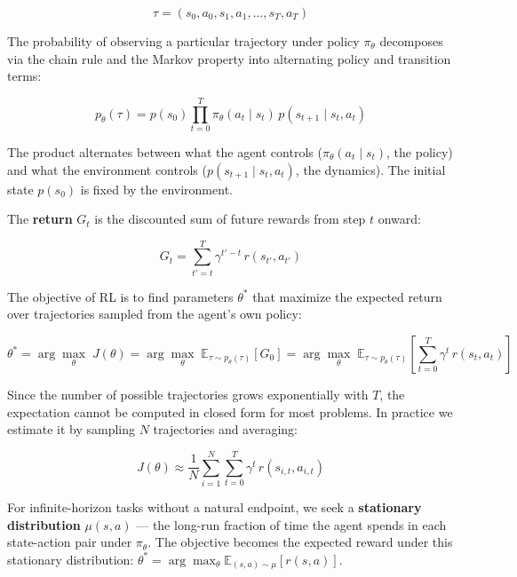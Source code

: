 \documentclass{book}
\begin{document}
\begin{equation}
\label{eq:trajectory}
\tau = (s_0, a_0, s_1, a_1, \ldots, s_T, a_T)
\end{equation}

The probability of observing a particular trajectory under policy
$\pi_\theta$ decomposes via the chain rule and the Markov property into
alternating policy and transition terms:

\begin{equation}
\label{eq:traj_prob}
p_\theta(\tau) = p(s_0) \prod_{t=0}^{T} \pi_\theta(a_t \mid s_t)\,
p(s_{t+1} \mid s_t, a_t)
\end{equation}

The product alternates between what the agent controls
($\pi_\theta(a_t \mid s_t)$, the policy) and what the environment controls
($p(s_{t+1} \mid s_t, a_t)$, the dynamics). The initial state $p(s_0)$
is fixed by the environment.

The \textbf{return} $G_t$ is the discounted sum of future rewards from
step $t$ onward:

\begin{equation}
\label{eq:return}
G_t = \sum_{t'=t}^{T} \gamma^{t'-t}\, r(s_{t'}, a_{t'})
\end{equation}

The objective of RL is to find parameters $\theta^*$ that maximize the
expected return over trajectories sampled from the agent's own policy:

\begin{equation}
\label{eq:rl_objective}
\theta^* = \arg\max_\theta\; J(\theta) = \arg\max_\theta\;
    \mathbb{E}_{\tau \sim p_\theta(\tau)}\!\left[G_0\right]
    = \arg\max_\theta\; \mathbb{E}_{\tau \sim p_\theta(\tau)}\!
    \left[\sum_{t=0}^{T} \gamma^t\, r(s_t, a_t)\right]
\end{equation}

Since the number of possible trajectories grows exponentially with $T$,
the expectation cannot be computed in closed form for most problems. In
practice we estimate it by sampling $N$ trajectories and averaging:

\begin{equation}
\label{eq:mc_objective}
J(\theta) \approx \frac{1}{N} \sum_{i=1}^{N} \sum_{t=0}^{T}
    \gamma^t\, r(s_{i,t}, a_{i,t})
\end{equation}

For infinite-horizon tasks without a natural endpoint, we seek a
\textbf{stationary distribution} $\mu(s, a)$ --- the long-run fraction of
time the agent spends in each state-action pair under $\pi_\theta$. The
objective becomes the expected reward under this stationary distribution:
$\theta^* = \arg\max_\theta \mathbb{E}_{(s,a) \sim \mu}[r(s,a)]$.
\end{document}
